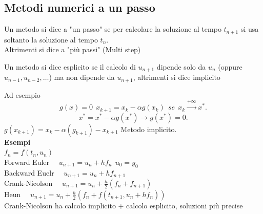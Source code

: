 \documentclass[12px]{article}
\begin{document}
	\subsection{Metodi numerici a un passo}
	\begin{defi}
		Un metodo si dice a "un passo" se per calcolare la soluzione al tempo $t_{n+1}$ si usa soltanto la soluzione al tempo $t_n$.\\
		Altrimenti si dice a "più passi" (Multi step)
	\end{defi}
	\begin{defi}
		Un metodo si dice esplicito se il calcolo di $u_{n+1}$ dipende solo da $u_n$ (oppure  $u_{n-1}, u_{n-2},\ldots$) ma non dipende da  $u_{n+1}$, altrimenti si dice implicito
	\end{defi}
	Ad esempio
	\[
		g(x) = 0 \ \ x_{k+1} = x_k - \alpha g(x_k) \ \ se \ \ x_k \xrightarrow{+\infty} x^*
	.\] 
	\[
		x^* = x^* - \alpha g(x^*) \rightarrow g(x^*) = 0
	.\] 
	$g(x_{k+1}) = x_k - \alpha(g_{k+1}) - x_{k+1}$ Metodo implicito.\\
	 \textbf{Esempi}\\
	 $f_n = f(t_n,u_n)$ \\
	 Forward Euler \ \ $u_{n+1} = u_n + hf_n\ \ u_0 = y_0$\\
	 Backward Euelr \ \ $u_{n+1} = u_n + h f_{n+1}$\\
	 Crank-Nicolson \ \  $u_{n+1} = u_n + \frac h 2 (f_n + f_{n+1})$\\
	 Heun \ \  $u_{n+1} = u_n + \frac h 2 (f_n+ f(t_{n+1}, u_n + hf_n))$\\
	 Crank-Nicolson ha calcolo implicito + calcolo esplicito, soluzioni più precise\\
\end{document}
